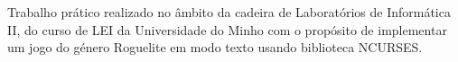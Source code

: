 Trabalho prático realizado no âmbito da cadeira de Laboratórios de Informática II, do curso de LEI da Universidade do Minho com o propósito de implementar um jogo do género Roguelite em modo texto usando biblioteca NCURSES. 